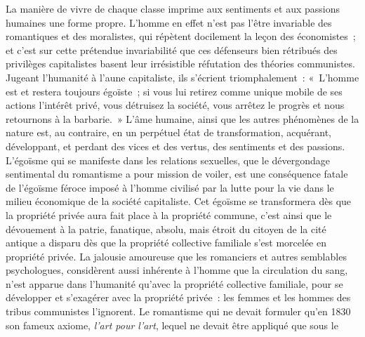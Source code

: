 \documentclass[french,twoside]{book} %
\begin{document}
La manière de vivre de chaque classe imprime aux sentiments et aux passions humaines une forme propre. L’homme en effet n’est pas l’être invariable des romantiques et des moralistes, qui répètent docilement la leçon des économistes ; et c’est sur cette prétendue invariabilité que ces défenseurs bien rétribués des privilèges capitalistes basent leur irrésistible réfutation des théories communistes. Jugeant l’humanité à l’aune capitaliste, ils s’écrient triomphalement : « L’homme est et restera toujours égoïste ; si vous lui retirez comme unique mobile de ses actions l’intérêt privé, vous détruisez la société, vous arrêtez le progrès et nous retournons à la barbarie. » L’âme humaine, ainsi que les autres phénomènes de la nature est, au contraire, en un perpétuel état de transformation, acquérant, développant, et perdant des vices et des vertus, des sentiments et des passions. L’égoïsme qui se manifeste dans les relations sexuelles, que le dévergondage sentimental du romantisme a pour mission de voiler, est une conséquence fatale de l’égoïsme féroce imposé à l’homme civilisé par la lutte pour la vie dans le milieu économique de la société capitaliste. Cet égoïsme se transformera dès que la propriété privée aura fait place à la propriété commune, c’est ainsi que le dévouement à la patrie, fanatique, absolu, mais étroit du citoyen de la cité antique a disparu dès que la propriété collective familiale s’est morcelée en propriété privée. La jalousie amoureuse que les romanciers et autres semblables psychologues, considèrent aussi inhérente à l’homme que la circulation du sang, n’est apparue dans l’humanité qu’avec la propriété collective familiale, pour se développer et s’exagérer avec la propriété privée : les femmes et les hommes des tribus communistes l’ignorent. Le romantisme qui ne devait formuler qu’en 1830 son fameux axiome, {\itshape l’art pour l’art}, lequel ne devait être appliqué que sous le  
\end{document}
